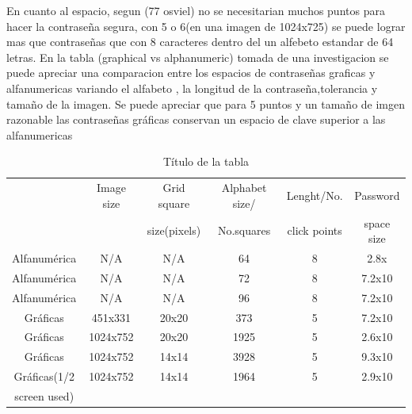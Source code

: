 \documentclass[12pt]{report}
\begin{document}
	En cuanto al espacio, segun (77 osviel) no se necesitarian muchos puntos para hacer la contraseña segura, con 5 o 6(en una imagen de 1024x725) se puede lograr mas que contraseñas que con 8 caracteres dentro del un alfebeto estandar de 64 letras. En la tabla (graphical vs alphanumeric) tomada de una investigacion se puede apreciar una comparacion entre los espacios de contraseñas graficas y alfanumericas variando el alfabeto , la longitud de la contraseña,tolerancia y tamaño de la imagen. Se puede apreciar que para 5 puntos y un tamaño de imgen razonable las contraseñas gráficas conservan un espacio de clave superior a las alfanumericas
	
	
\begin{table}[h!]
	\centering
	\begin{tabular}{|c|c|c|c|c|c|}
		\hline
				 	 
		         		 & Image size &   Grid square &	Alphabet size/ &Lenght/No.  & Password \\ 
		                &           &  size(pixels)  & No.squares& click points & space size \\ \hline
		Alfanumérica    & N/A       & N/A     & 64   & 8  & 2.8x \\ \hline
		Alfanumérica    & N/A       & N/A     & 72   & 8  & 7.2x10 \\ \hline
		Alfanumérica    & N/A       & N/A     & 96   & 8  & 7.2x10 \\ \hline
		Gráficas        & 451x331   & 20x20   & 373  & 5  & 7.2x10 \\ \hline
		Gráficas        & 1024x752  & 20x20   & 1925 & 5  & 2.6x10 \\ \hline
		Gráficas        & 1024x752  & 14x14   & 3928 & 5  & 9.3x10 \\ \hline
		Gráficas(1/2   & 1024x752  & 14x14   & 1964 & 5  & 2.9x10 \\ 
		screen used)   &   &    &  &  &  \\ \hline
	\end{tabular}
	\caption{Título de la tabla}
	\label{tabla:ejemplo}
\end{table}


	

	
	
	
	
\end{document}
